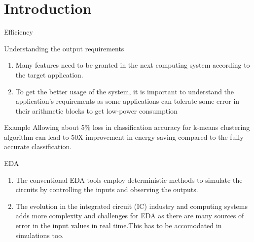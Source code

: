 \documentclass{beamer}
\begin{document}
\section{Introduction}
\begin{frame}{Efficiency}
\begin{block}{Understanding the output requirements}
\begin{enumerate}
    \item Many features need to be granted in the next computing system according to the target application.
    \item To get the better usage of the system, it is important to understand the application’s requirements as some applications can tolerate some error in their arithmetic blocks to get low-power consumption
\end{enumerate}
\end{block}
\begin{block}{Example}
Allowing about 5\% loss in classification accuracy for k-means clustering algorithm can lead to 50X improvement in energy saving compared to the fully accurate classification.
\end{block}
\end{frame}

\begin{frame}{EDA}
\begin{block}{}
\begin{enumerate}
    \item The conventional EDA tools employ deterministic methods to simulate the circuits by controlling the inputs and observing the outputs.
    \item The evolution in the integrated circuit (IC) industry and computing systems adds more complexity and challenges for EDA as there are many sources of error in the input values in real time.This has to be accomodated in simulations too.
\end{enumerate}
\end{block}

\end{frame}
\end{document}
